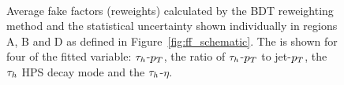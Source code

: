\begin{figure}[p!]
\centering
     \\
\caption[Plots of the average fake factors calculated by the BDT reweighter.]{Average fake factors (reweights) calculated by the BDT reweighting method and the statistical uncertainty shown individually in regions A, B and D as defined in Figure~\ref{fig:ff_schematic}. The is shown for four of the fitted variable: $\tau_{h}$-$p_{T}$, the ratio of $\tau_{h}$-$p_{T}$ to jet-$p_{T}$, the $\tau_{h}$ HPS decay mode and the $\tau_{h}$-$\eta$.}
\label{fig:4tau_ff_reweights}
\end{figure}

